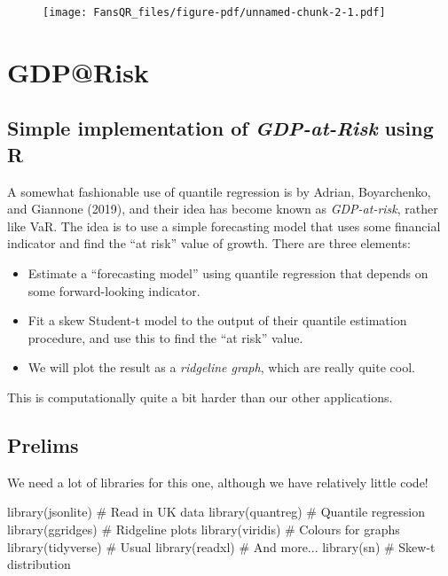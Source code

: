 \documentclass[
  letterpaper,
]{book}
\newenvironment{Shaded}{\begin{snugshade}}{\end{snugshade}}
\newcommand{\CommentTok}[1]{\textcolor[rgb]{0.37,0.37,0.37}{#1}}
\newcommand{\FunctionTok}[1]{\textcolor[rgb]{0.28,0.35,0.67}{#1}}
\newcommand{\NormalTok}[1]{\textcolor[rgb]{0.00,0.23,0.31}{#1}}
\providecommand{\tightlist}{%
  \setlength{\itemsep}{0pt}\setlength{\parskip}{0pt}}\usepackage{longtable,booktabs,array}
\begin{document}
\begin{figure}[H]

{\centering \texttt{[image: FansQR\_files/figure-pdf/unnamed-chunk-2-1.pdf]}

}

\end{figure}

\hypertarget{gdprisk}{%
\chapter{GDP@Risk}\label{gdprisk}}

\hypertarget{simple-implementation-of-gdp-at-risk-using-r}{%
\section{\texorpdfstring{Simple implementation of \emph{GDP-at-Risk}
using
R}{Simple implementation of GDP-at-Risk using R}}\label{simple-implementation-of-gdp-at-risk-using-r}}

A somewhat fashionable use of quantile regression is by Adrian,
Boyarchenko, and Giannone (2019), and their idea has become known as
\emph{GDP-at-risk}, rather like VaR. The idea is to use a simple
forecasting model that uses some financial indicator and find the ``at
risk'' value of growth. There are three elements:

\begin{itemize}
\tightlist
\item
  Estimate a ``forecasting model'' using quantile regression that
  depends on some forward-looking indicator.
\item
  Fit a skew Student-t model to the output of their quantile estimation
  procedure, and use this to find the ``at risk'' value.
\item
  We will plot the result as a \emph{ridgeline graph}, which are really
  quite cool.
\end{itemize}

This is computationally quite a bit harder than our other applications.

\hypertarget{prelims}{%
\section{Prelims}\label{prelims}}

We need a lot of libraries for this one, although we have relatively
little code!

\begin{Shaded}
\begin{Highlighting}[]
\FunctionTok{library}\NormalTok{(jsonlite)          }\CommentTok{\# Read in UK data}
\FunctionTok{library}\NormalTok{(quantreg)          }\CommentTok{\# Quantile regression}
\FunctionTok{library}\NormalTok{(ggridges)          }\CommentTok{\# Ridgeline plots}
\FunctionTok{library}\NormalTok{(viridis)           }\CommentTok{\# Colours for graphs}
\FunctionTok{library}\NormalTok{(tidyverse)         }\CommentTok{\# Usual}
\FunctionTok{library}\NormalTok{(readxl)            }\CommentTok{\# And more...}
\FunctionTok{library}\NormalTok{(sn)                }\CommentTok{\# Skew{-}t distribution}
\end{Highlighting}
\end{Shaded}
\end{document}
